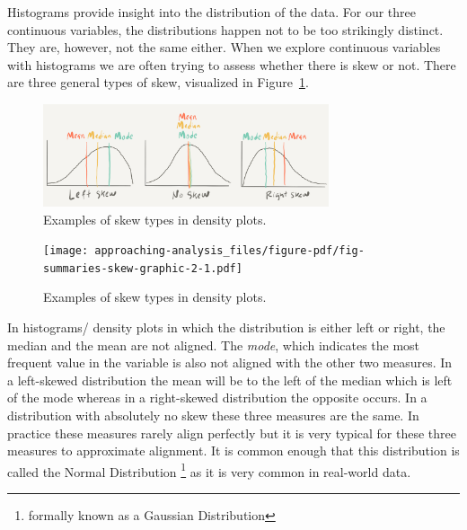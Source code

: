 \documentclass[
  letterpaper,
]{latex/krantz}
\begin{document}
Histograms provide insight into the distribution of the data. For our
three continuous variables, the distributions happen not to be too
strikingly distinct. They are, however, not the same either. When we
explore continuous variables with histograms we are often trying to
assess whether there is skew or not. There are three general types of
skew, visualized in Figure~\ref{fig-summaries-skew-graphic}.

\begin{figure}[h]

{\centering \includegraphics[width=0.75\textwidth,height=\textheight]{figures/approaching-analysis/skew-types-paper.png}

}

\caption{\label{fig-summaries-skew-graphic}Examples of skew types in
density plots.}

\end{figure}

\begin{figure}[h]

{\centering \texttt{[image: approaching-analysis\_files/figure-pdf/fig-summaries-skew-graphic-2-1.pdf]}

}

\caption{\label{fig-summaries-skew-graphic-2}Examples of skew types in
density plots.}

\end{figure}

In histograms/ density plots in which the distribution is either left or
right, the median and the mean are not aligned. The \emph{mode}, which
indicates the most frequent value in the variable is also not aligned
with the other two measures. In a left-skewed distribution the mean will
be to the left of the median which is left of the mode whereas in a
right-skewed distribution the opposite occurs. In a distribution with
absolutely no skew these three measures are the same. In practice these
measures rarely align perfectly but it is very typical for these three
measures to approximate alignment. It is common enough that this
distribution is called the Normal Distribution \footnote{formally known
  as a Gaussian Distribution} as it is very common in real-world data.
\end{document}
